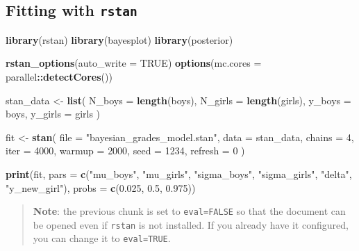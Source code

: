 \documentclass[
  12pt,
]{article}
\newenvironment{Shaded}{\begin{snugshade}}{\end{snugshade}}
\newcommand{\AttributeTok}[1]{\textcolor[rgb]{0.13,0.29,0.53}{#1}}
\newcommand{\ConstantTok}[1]{\textcolor[rgb]{0.56,0.35,0.01}{#1}}
\newcommand{\DecValTok}[1]{\textcolor[rgb]{0.00,0.00,0.81}{#1}}
\newcommand{\FloatTok}[1]{\textcolor[rgb]{0.00,0.00,0.81}{#1}}
\newcommand{\FunctionTok}[1]{\textcolor[rgb]{0.13,0.29,0.53}{\textbf{#1}}}
\newcommand{\NormalTok}[1]{#1}
\newcommand{\OtherTok}[1]{\textcolor[rgb]{0.56,0.35,0.01}{#1}}
\newcommand{\SpecialCharTok}[1]{\textcolor[rgb]{0.81,0.36,0.00}{\textbf{#1}}}
\newcommand{\StringTok}[1]{\textcolor[rgb]{0.31,0.60,0.02}{#1}}
\begin{document}
\subsection{\texorpdfstring{Fitting with
\texttt{rstan}}{Fitting with rstan}}\label{fitting-with-rstan}

\begin{Shaded}
\begin{Highlighting}[]
\FunctionTok{library}\NormalTok{(rstan)}
\FunctionTok{library}\NormalTok{(bayesplot)}
\FunctionTok{library}\NormalTok{(posterior)}

\FunctionTok{rstan\_options}\NormalTok{(}\AttributeTok{auto\_write =} \ConstantTok{TRUE}\NormalTok{)}
\FunctionTok{options}\NormalTok{(}\AttributeTok{mc.cores =}\NormalTok{ parallel}\SpecialCharTok{::}\FunctionTok{detectCores}\NormalTok{())}

\NormalTok{stan\_data }\OtherTok{\textless{}{-}} \FunctionTok{list}\NormalTok{(}
  \AttributeTok{N\_boys  =} \FunctionTok{length}\NormalTok{(boys),}
  \AttributeTok{N\_girls =} \FunctionTok{length}\NormalTok{(girls),}
  \AttributeTok{y\_boys  =}\NormalTok{ boys,}
  \AttributeTok{y\_girls =}\NormalTok{ girls}
\NormalTok{)}

\NormalTok{fit }\OtherTok{\textless{}{-}} \FunctionTok{stan}\NormalTok{(}
  \AttributeTok{file =} \StringTok{"bayesian\_grades\_model.stan"}\NormalTok{,}
  \AttributeTok{data =}\NormalTok{ stan\_data,}
  \AttributeTok{chains =} \DecValTok{4}\NormalTok{,}
  \AttributeTok{iter =} \DecValTok{4000}\NormalTok{,}
  \AttributeTok{warmup =} \DecValTok{2000}\NormalTok{,}
  \AttributeTok{seed =} \DecValTok{1234}\NormalTok{,}
  \AttributeTok{refresh =} \DecValTok{0}
\NormalTok{)}

\FunctionTok{print}\NormalTok{(fit, }\AttributeTok{pars =} \FunctionTok{c}\NormalTok{(}\StringTok{"mu\_boys"}\NormalTok{, }\StringTok{"mu\_girls"}\NormalTok{, }\StringTok{"sigma\_boys"}\NormalTok{, }\StringTok{"sigma\_girls"}\NormalTok{, }\StringTok{"delta"}\NormalTok{, }\StringTok{"y\_new\_girl"}\NormalTok{),}
      \AttributeTok{probs =} \FunctionTok{c}\NormalTok{(}\FloatTok{0.025}\NormalTok{, }\FloatTok{0.5}\NormalTok{, }\FloatTok{0.975}\NormalTok{))}
\end{Highlighting}
\end{Shaded}

\begin{quote}
\textbf{Note}: the previous chunk is set to \texttt{eval=FALSE} so that
the document can be opened even if \texttt{rstan} is not installed. If
you already have it configured, you can change it to \texttt{eval=TRUE}.
\end{quote}
\end{document}
